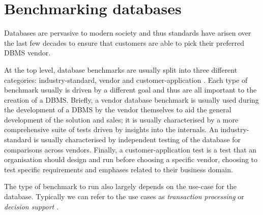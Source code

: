 \section{Benchmarking databases}
Databases are pervasive to modern society and thus standards have arisen over
the last few decades to ensure that customers are able to pick their preferred
DBMS vendor.

At the top level, database benchmarks are usually split into three different
categories: industry-standard, vendor and
customer-application \cite{PractitionersIntroduction}. Each type of benchmark
usually is driven by a different goal and thus are all important to the creation
of a DBMS. Briefly, a vendor database benchmark is usually used during the
development of a DBMS by the vendor themselves to aid
the general development of the solution and sales; it is usually characterised
by a more comprehensive suite of tests driven by insights into the internals. An
industry-standard is usually characterised by independent testing of the
database for comparisons across vendors. Finally, a customer-application test is
a test that an organisation should design and run before choosing a specific
vendor, choosing to test specific requirements and emphases related to their
business domain.


The type of benchmark to run also largely depends on the use-case for the
database. Typically we can refer to the use cases as \emph{transaction
processing} or \emph{decision support} \cite{PractitionersIntroduction}.
